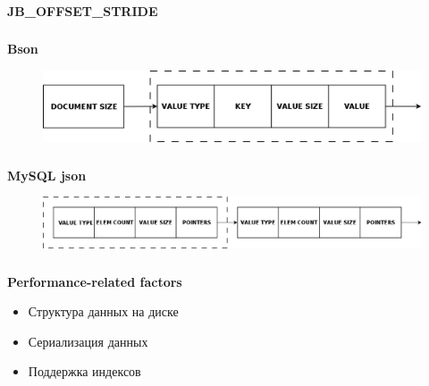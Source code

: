\documentclass[usenames,dvipsnames, 18pt, compress, aspectratio=169]{beamer}
\begin{document}
\begin{frame}
    \frametitle{}
    \begin{center}
    \textbf{JB\_OFFSET\_STRIDE}
    \end{center}
\end{frame}

\begin{frame}
    \frametitle{}
    \begin{center}
    \textbf{Bson}
    \begin{figure}
        \includegraphics[width=1.0\textwidth,center]{bson.png}
    \end{figure}
    \end{center}
\end{frame}


\begin{frame}
    \frametitle{}
    \begin{center}
    \textbf{MySQL json}
    \begin{figure}
        \includegraphics[width=1.0\textwidth,center]{mysql_json.png}
    \end{figure}
    \end{center}
\end{frame}

\begin{frame}
    \frametitle{}
    \begin{center}
        \textbf{Performance-related factors}
        \pause
        \begin{itemize}[label={\MVRightarrow}]
            \item <+-> Структура данных на диске
            \item <+-> Сериализация данных
            \item <+-> Поддержка индексов
        \end{itemize}
    \end{center}
\end{frame}
\end{document}
